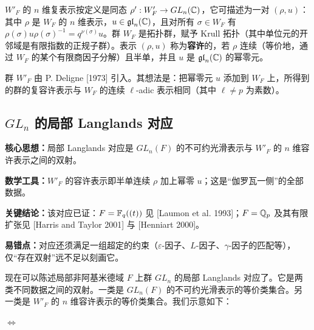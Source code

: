$W'_F$ 的 $n$ 维复表示按定义是同态 $\rho':W'_F\to GL_n(\mathbb{C})$，它可描述为一对 $(\rho,u)$：其中 $\rho$ 是 $W_F$ 的 $n$ 维表示，$u\in\mathfrak{gl}_n(\mathbb{C})$，且对所有 $\sigma\in W_F$ 有 $\rho(\sigma)u\rho(\sigma)^{-1}=q^{\nu(\sigma)}u$。群 $W_F$ 是拓扑群，赋予 Krull 拓扑（其中单位元的开邻域是有限指数的正规子群）。表示 $(\rho,u)$ 称为\textbf{容许}的，若 $\rho$ 连续（等价地，通过 $W_F$ 的某个有限商因子分解）且半单，并且 $u$ 是 $\mathfrak{gl}_n(\mathbb{C})$ 的幂零元。


群 $W'_F$ 由 P. Deligne [1973] 引入。其想法是：把幂零元 $u$ 添加到 $W_F$ 上，所得到的群的复容许表示与 $W_F$ 的连续 $\ell$-adic 表示相同（其中 $\ell\neq p$ 为素数）。


\subsection{$GL_n$ 的局部 Langlands 对应}

\begin{keypoints}
    \item \textbf{核心思想：}局部 Langlands 对应是 $GL_n(F)$ 的不可约光滑表示与 $W'_F$ 的 $n$ 维容许表示之间的双射。
    \item \textbf{数学工具：}$W'_F$ 的容许表示即半单连续 $\rho$ 加上幂零 $u$；这是“伽罗瓦一侧”的全部数据。
    \item \textbf{关键结论：}该对应已证：$F=\mathbb{F}_q((t))$ 见 [Laumon et al. 1993]；$F=\mathbb{Q}_p$ 及其有限扩张见 [Harris and Taylor 2001] 与 [Henniart 2000]。
    \item \textbf{易错点：}对应还须满足一组超定的约束（$\varepsilon$-因子、$L$-因子、$\gamma$-因子的匹配等），仅“存在双射”远不足以刻画它。
\end{keypoints}

现在可以陈述局部非阿基米德域 $F$ 上群 $GL_n$ 的局部 Langlands 对应了。它是两类不同数据之间的双射。一类是 $GL_n(F)$ 的不可约光滑表示的等价类集合。另一类是 $W'_F$ 的 $n$ 维容许表示的等价类集合。我们示意如下：
\begin{center}
\quad$\Longleftrightarrow$\quad
{}
\end{center}

